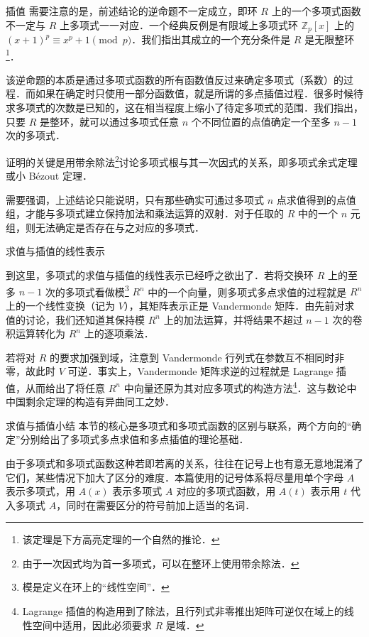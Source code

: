 \documentclass[fontset=fandol]{ctexbeamer}
\begin{document}
\begin{frame}{插值}
    需要注意的是，前述结论的逆命题不一定成立，即\alert{环 $R$ 上的一个多项式函数不一定与 $R$ 上多项式一一对应}．一个经典反例是有限域上多项式环 $\mathbb Z_p[x]$ 上的 $(x+1)^p \equiv x^p + 1 \pmod{p}$．我们指出其成立的一个充分条件是 \alert{$R$ 是无限整环}\footnote{该定理是下方高亮定理的一个自然的推论．}．

    该逆命题的本质是通过多项式函数的所有函数值反过来确定多项式（系数）的过程．而如果在确定时只使用一部分函数值，就是所谓的多点插值过程．很多时候待求多项式的次数是已知的，这在相当程度上缩小了待定多项式的范围．我们指出，\alert{只要 $R$ 是整环，就可以通过多项式任意 $n$ 个不同位置的点值确定一个至多 $n-1$ 次的多项式．}

    证明的关键是用带余除法\footnote{由于一次因式均为首一多项式，可以在整环上使用带余除法．}讨论多项式根与其一次因式的关系，即多项式余式定理或小 B{\'e}zout 定理\cite[第 7 章第 6 节定理 6, p. 35]{qiu-algebra}．
    
    需要强调，上述结论只能说明，只有那些确实可通过多项式 $n$ 点求值得到的点值组，才能与多项式建立保持加法和乘法运算的双射．对于任取的 $R$ 中的一个 $n$ 元组，则无法确定是否存在与之对应的多项式．
\end{frame}

\begin{frame}{求值与插值的线性表示}
    
    到这里，多项式的求值与插值的线性表示已经呼之欲出了．若将交换环 $R$ 上的至多 $n-1$ 次的多项式看做模\footnote{模是定义在环上的“线性空间”．} $R^n$ 中的一个向量，则多项式多点求值的过程就是 $R^n$ 上的一个线性变换（记为 $V$），其矩阵表示正是 Vandermonde 矩阵．由先前对求值的讨论，我们还知道其保持模 $R^n$ 上的加法运算，并将结果不超过 $n-1$ 次的卷积运算转化为 $R^n$ 上的逐项乘法．

    若将对 $R$ 的要求\alert{加强到域}，注意到 Vandermonde 行列式在参数互不相同时非零，故此时 $V$ 可逆．事实上，\alert{Vandermonde 矩阵求逆的过程就是 Lagrange 插值}，从而给出了将任意 $R^n$ 中向量还原为其对应多项式的构造方法\footnote{Lagrange 插值的构造用到了除法，且行列式非零推出矩阵可逆仅在域上的线性空间中适用，因此必须要求 $R$ 是域．}．这与数论中中国剩余定理的构造有异曲同工之妙\cite[in section: A perspective from linear algebra]{wikipedia-lagrange}．
\end{frame}

\begin{frame}{求值与插值}{小结}
    本节的核心是多项式和多项式函数的区别与联系，两个方向的“确定”分别给出了多项式多点求值和多点插值的理论基础．

    由于多项式和多项式函数这种若即若离的关系，往往在记号上也有意无意地混淆了它们，某些情况下加大了区分的难度．本篇使用的记号体系将尽量用单个字母 $A$ 表示多项式，用 $A(x)$ 表示多项式 $A$ 对应的多项式函数，用 $A(t)$ 表示用 $t$ 代入多项式 $A$，同时在需要区分的符号前加上适当的名词．
\end{frame}
\end{document}
